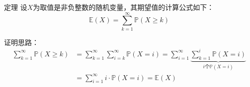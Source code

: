 \documentclass[t]{beamer}
\renewcommand{\Pr}{\mathbb{P}}
\newcommand{\E}{\mathbb{E}}
\begin{document}
  \begin{frame}{定理}
    设$X$为取值是非负整数的随机变量，其期望值的计算公式如下：
    \begin{equation*}\E(X)=\sum_{k=1}^{\infty}\Pr(X\ge k)
    \end{equation*}
  
    \begin{block}{证明思路：}
      \begin{equation*}\begin{split}
        \sum_{k=1}^{\infty}\Pr(X\ge
        k)&=\sum_{k=1}^{\infty}\sum_{i=k}^{\infty}\Pr(X=i)=\sum_{i=1}^{\infty}\underbrace{\sum_{k=1}^{i}\Pr(X=i)}_{i\text{个}\Pr(X=i)}\\
          &=\sum_{i=1}^{\infty}i\cdot \Pr(X=i)=\E(X)\\
          \end{split}\end{equation*}
    \end{block}
  \end{frame}
  
\end{document}
